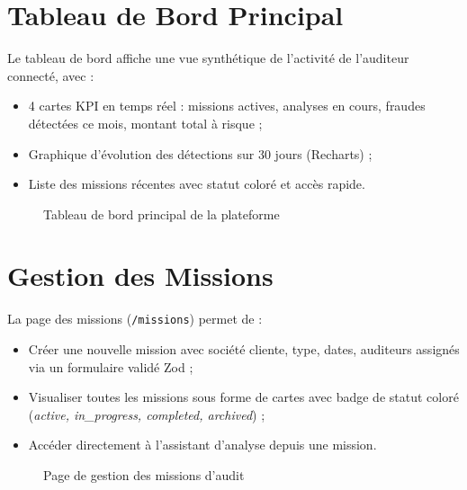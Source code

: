 \documentclass[12pt,a4paper,twoside]{report}
\theoremstyle{definition}
\begin{document}
\section{Tableau de Bord Principal}

Le tableau de bord affiche une vue synthétique de l'activité de l'auditeur
connecté, avec :

\begin{itemize}
  \item 4 cartes KPI en temps réel : missions actives, analyses en cours,
    fraudes détectées ce mois, montant total à risque ;
  \item Graphique d'évolution des détections sur 30 jours (Recharts) ;
  \item Liste des missions récentes avec statut coloré et accès rapide.
\end{itemize}

\begin{figure}[H]
\centering
{}
\caption{Tableau de bord principal de la plateforme}
\label{fig:ui_dashboard}
\end{figure}

\section{Gestion des Missions}

La page des missions (\texttt{/missions}) permet de :

\begin{itemize}
  \item Créer une nouvelle mission avec société cliente, type, dates,
    auditeurs assignés via un formulaire validé Zod ;
  \item Visualiser toutes les missions sous forme de cartes avec badge de statut
    coloré (\textit{active, in\_progress, completed, archived}) ;
  \item Accéder directement à l'assistant d'analyse depuis une mission.
\end{itemize}

\begin{figure}[H]
\centering
{}
\caption{Page de gestion des missions d'audit}
\label{fig:ui_missions}
\end{figure}
\end{document}
